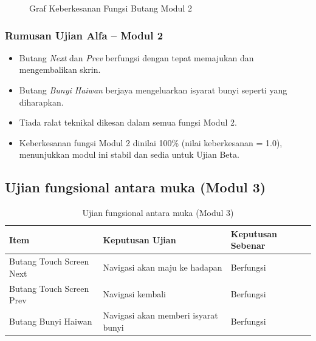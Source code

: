 {{\begin{figure}[h]
\centering
{}
\caption{Graf Keberkesanan Fungsi Butang Modul 2}
\label{rajah-5-3}
\end{figure}
\subsubsection{Rumusan Ujian Alfa – Modul 2}

\begin{itemize}[h]
  \item Butang \textit{Next} dan \textit{Prev} berfungsi dengan tepat memajukan dan mengembalikan skrin.
  \item Butang \textit{Bunyi Haiwan} berjaya mengeluarkan isyarat bunyi seperti yang diharapkan.
  \item Tiada ralat teknikal dikesan dalam semua fungsi Modul 2.
  \item Keberkesanan fungsi Modul 2 dinilai 100\% (nilai keberkesanan = 1.0), menunjukkan modul ini stabil dan sedia untuk Ujian Beta.
\end{itemize}
\clearpage

\subsection{Ujian fungsional antara muka (Modul 3)}
\begin{table}[h]
\centering
\caption{Ujian fungsional antara muka (Modul 3)}
\label{jadual-5-4}
\begin{tabular}{|l|l|l|}
\hline
\textbf{Item} & \textbf{Keputusan Ujian} & \textbf{Keputusan Sebenar} \\ \hline
Butang Touch Screen Next & Navigasi akan maju ke hadapan & Berfungsi \\ \hline
Butang Touch Screen Prev & Navigasi kembali & Berfungsi \\ \hline
Butang Bunyi Haiwan & Navigasi akan memberi isyarat bunyi & Berfungsi \\ \hline
\end{tabular}
\end{table}

}}
